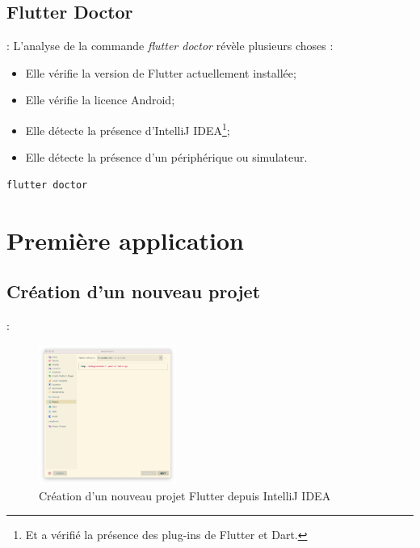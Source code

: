 \documentclass[10pt]{beamer}
\begin{document}
\subsection{Flutter Doctor}
\begin{frame}[fragile,t]{\secname : \subsecname}
    L’analyse de la commande \textit{flutter doctor} révèle plusieurs choses :
    \begin{itemize}
        \item Elle vérifie la version de Flutter actuellement installée;
        \item Elle vérifie la licence Android;
        \item Elle détecte la présence d’IntelliJ IDEA\footnote{Et a vérifié la présence des plug-ins de Flutter  et Dart.};
        \item Elle détecte la présence d'un périphérique ou simulateur.
    \end{itemize}
    \begin{lstlisting}[caption={Vérifier l'installation},language=bash, label=getversion]
        flutter doctor
        \end{lstlisting}
\end{frame}

\section{Première application}
\subsection{Création d'un nouveau projet}
\begin{frame}[fragile,t]{\secname : \subsecname}
    \begin{figure}[H]
        \begin{center}
            \includegraphics[width=0.4\textwidth]{../assets/img/new-project-1.jpg}
            \caption*{Création d'un nouveau projet Flutter depuis IntelliJ IDEA}
            \label{Fig:new-project-1}
        \end{center}
    \end{figure}
\end{frame}
\end{document}
